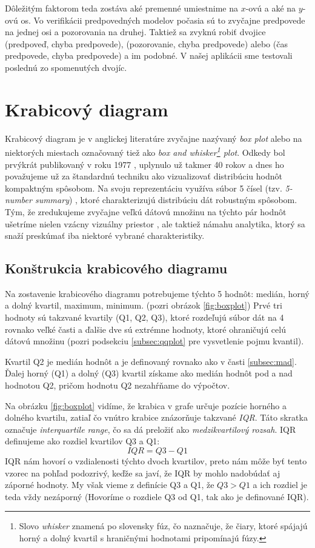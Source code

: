 Dôležitým faktorom teda zostáva aké premenné umiestnime na \mbox{$ x $-ovú} a aké na \mbox{$ y $-ovú} os. Vo verifikácii predpovedných modelov počasia sú to zvyčajne predpovede na jednej osi a pozorovania na druhej. Taktiež sa zvyknú robiť dvojice (predpoveď, chyba predpovede), (pozorovanie, chyba predpovede) alebo (čas predpovede, chyba predpovede) a im podobné. V našej aplikácii sme testovali poslednú zo spomenutých dvojíc.

\section{Krabicový diagram}
\label{subsec:boxplot}
Krabicový diagram je v anglickej literatúre zvyčajne nazývaný \textit{box plot} alebo na niektorých miestach označovaný tiež ako \textit{box and whisker\footnote{Slovo \textit{whisker} znamená po slovensky fúz, čo naznačuje, že čiary, ktoré spájajú horný a dolný kvartil s hraničnými hodnotami pripomínajú fúzy.} plot}. Odkedy bol prvýkrát publikovaný v roku 1977 \cite{Tukey}, uplynulo už takmer 40 rokov a dnes ho považujeme už za štandardnú techniku ako vizualizovať distribúciu hodnôt kompaktným spôsobom. Na svoju reprezentáciu využíva súbor 5 čísel (tzv. \textit{\mbox{5-number} summary}) \cite{Potter}, ktoré charakterizujú distribúciu dát robustným spôsobom. Tým, že zredukujeme zvyčajne veľkú dátovú množinu na týchto pár hodnôt ušetríme nielen vzácny vizuálny priestor \cite{Wickham}, ale taktiež námahu analytika, ktorý sa snaží preskúmať iba niektoré vybrané charakteristiky. 

\subsection{Konštrukcia krabicového diagramu}

Na zostavenie krabicového diagramu potrebujeme týchto 5 hodnôt: medián, horný a dolný kvartil, maximum, minimum. (pozri obrázok \ref{fig:boxplot}) Prvé tri hodnoty sú takzvané kvartily (Q1, Q2, Q3), ktoré rozdeľujú súbor dát na 4 rovnako veľké časti a ďalšie dve sú extrémne hodnoty, ktoré ohraničujú celú dátovú množinu (pozri podsekciu \ref{subsec:qqplot} pre vysvetlenie pojmu kvantil). 

Kvartil Q2 je medián hodnôt a je definovaný rovnako ako v časti \ref{subsec:mad}. Ďalej horný (Q1) a dolný (Q3) kvartil získame ako medián hodnôt pod a nad hodnotou Q2, pričom hodnotu Q2 nezahŕňame do výpočtov. 

Na obrázku \ref{fig:boxplot} vidíme, že krabica v grafe určuje pozície horného a dolného kvartilu, zatiaľ čo vnútro krabice znázorňuje takzvané \textit{IQR}. Táto skratka označuje \textit{interquartile range}, čo sa dá preložiť ako \textit{medzikvartilový rozsah}. IQR definujeme ako rozdiel kvartilov Q3 a Q1:
\[
IQR = Q3 - Q1
\]
IQR nám hovorí o vzdialenosti týchto dvoch kvartilov, preto nám môže byť tento vzorec na pohľad podozrivý, keďže sa javí, že IQR by mohlo nadobúdať aj záporné hodnoty. My však vieme z definície Q3 a Q1, že $ Q3 > Q1 $ a ich rozdiel je teda vždy nezáporný (Hovoríme o rozdiele Q3 od Q1, tak ako je definované IQR).

